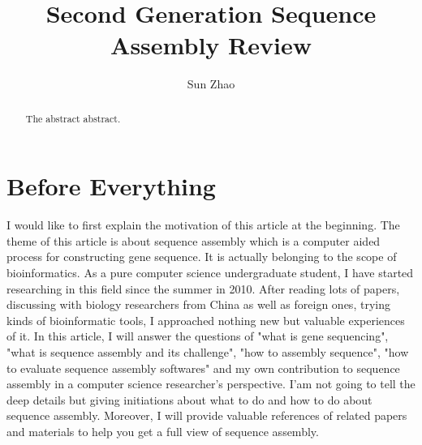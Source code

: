 \documentclass{article}
\title{Second Generation Sequence Assembly Review}
\author{Sun Zhao}
\begin{document}
\maketitle
\newpage

\begin{abstract}
The abstract abstract.
\end{abstract}

\section{Before Everything}
I would like to first explain the motivation of this article at the beginning. The theme of this article is about sequence assembly which is a computer aided process for constructing gene sequence. It is actually belonging to the scope of bioinformatics. As a pure computer science undergraduate student, I have started researching in this field since the summer in 2010. After reading lots of papers, discussing with biology researchers from China as well as foreign ones, trying kinds of bioinformatic tools, I approached nothing new but valuable experiences of it. In this article, I will answer the questions of "what is gene sequencing", "what is sequence assembly and its challenge", "how to assembly sequence", "how to evaluate sequence assembly softwares" and my own contribution to sequence assembly in a computer science researcher's perspective. I'am not going to tell the deep details but giving initiations about what to do and how to do about sequence assembly. Moreover, I will provide valuable references of related papers and materials to help you get a full view of sequence assembly.
\end{document}
